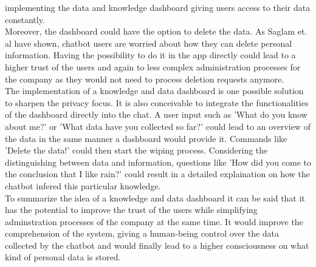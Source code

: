 \documentclass[sigconf, nonacm]{acmart}
\begin{document}
implementing the data and knowledge dashboard giving users access to their data constantly.
\\
Moreover, the dashboard could have the option to delete the data. As Saglam et. al \cite{Saglam2021} have shown, chatbot users are worried about how they can delete personal information. Having the possibility to do it in the app directly could lead to a higher trust of the users and again to less complex administration processes for the company
as they would not need to process deletion requests anymore.
\\
The implementation of a knowledge and data dashboard is one possible solution to sharpen the privacy focus. It is also conceivable to integrate the functionalities of the dashboard directly into the chat.
A user input such as 'What do you know about me?' or 'What data have you collected so far?' could lead to an overview of the data in the same manner a dashboard would provide it.
Commands like 'Delete the data!' could then start the wiping process. 
Considering the distinguishing between data and information, questions like 'How did you come to the conclusion that I like rain?' could result in a detailed explaination on how the chatbot infered this particular knowledge.
\\
To summarize the idea of a knowledge and data dashboard it can be said that it has the potential to improve the trust of the users while simplifying adminstration processes of the company at the same time. 
It would improve the comprehension of the system, giving a human-being control over the data collected by the chatbot and would finally lead to a higher consciousness on what kind of personal data is stored.
\end{document}
